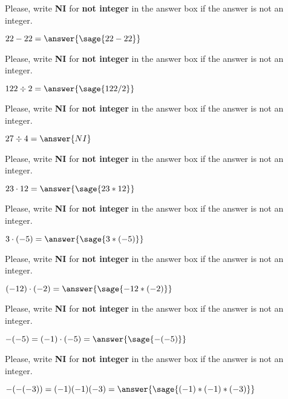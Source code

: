 \documentclass{ximera}
\begin{document}
\begin{shuffle}[3]
\begin{problem}
Please, write \textbf{NI} for \textbf{not integer} in the answer box if the answer is not an integer.

$22-22=\answer{\sage{22-22}}$
\end{problem}


\begin{problem}
Please, write \textbf{NI} for \textbf{not integer} in the answer box if the answer is not an integer.

$122\div 2=\answer{\sage{122/2}}$
\end{problem}



\begin{problem}
Please, write \textbf{NI} for \textbf{not integer} in the answer box if the answer is not an integer.

$27\div 4=\answer{NI}$
\end{problem}


\begin{problem}
Please, write \textbf{NI} for \textbf{not integer} in the answer box if the answer is not an integer.

$23\cdot 12=\answer{\sage{23*12}}$
\end{problem}

\begin{problem}
Please, write \textbf{NI} for \textbf{not integer} in the answer box if the answer is not an integer.

$3\cdot (-5)=\answer{\sage{3*(-5)}}$
\end{problem}


\begin{problem}
Please, write \textbf{NI} for \textbf{not integer} in the answer box if the answer is not an integer.

$(-12)\cdot(-2)=\answer{\sage{-12*(-2)}}$
\end{problem}


\begin{problem}
Please, write \textbf{NI} for \textbf{not integer} in the answer box if the answer is not an integer.

$-(-5)=(-1)\cdot(-5)=\answer{\sage{-(-5)}}$
\end{problem}


\begin{problem}
Please, write \textbf{NI} for \textbf{not integer} in the answer box if the answer is not an integer.

$-(-(-3))=(-1)(-1)(-3)=\answer{\sage{(-1)*(-1)*(-3)}}$
\end{problem}





\end{shuffle}
\end{document}
